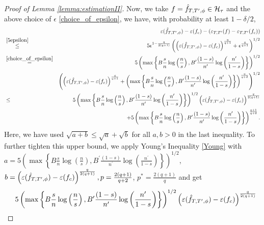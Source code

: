 \documentclass{article}
\begin{document}
\begin{proof}[Proof of Lemma \ref{lemma:estimationII}]
Now, we take $f = \Hat{f}_{T, T^\prime,\phi} \in \mathcal{H}_\tau$ and the above choice of $\epsilon$ \eqref{choice_of_epsilon}, we have,  with probability at least $1-\delta/2$, 
\begin{eqnarray*}
&&  \varepsilon (\Hat{f}_{T, T^\prime,\phi}) - \varepsilon (f_c) - \left(\varepsilon_{T, T'} (f) - \varepsilon_{T, T'} (f_c)\right)\\
  &\stackrel{\eqref{5epsilon}}{\leq}& 5 \epsilon^{1-{\frac{q}{2(q+1)}}}\left(\left(\varepsilon (\Hat{f}_{T, T^\prime,\phi}) - \varepsilon (f_c)\right)^{\frac{q}{q+1}} + \epsilon^{\frac{q}{q+1}}\right)^{1/2}\\
  &\stackrel{\eqref{choice_of_epsilon}}{=}& 5 \left(  \max\left\{ B \frac{s}{n}
\log \left(\frac{n}{s}\right),B^\prime \frac{(1-s)}{n^\prime}\log \left(\frac{n^\prime}{1-s}\right) \right\}\right)^{1/2}\\
&&\left(\left(\varepsilon (\Hat{f}_{T, T^\prime,\phi}) - \varepsilon (f_c)\right)^{\frac{q}{q+1}} + \left( \max\left\{ B  \frac{s}{n}
\log \left(\frac{n}{s}\right), B^\prime \frac{(1-s)}{n^\prime}\log \left(\frac{n^\prime}{1-s}\right) \right\}\right)^{\frac{q}{q+2} } \right)^{1/2} \\
&\leq& 5 \left(  \max\left\{ B \frac{s}{n}
\log \left(\frac{n}{s}\right), B^\prime \frac{(1-s)}{n^\prime}\log \left(\frac{n^\prime}{1-s}\right) \right\} \right)^{1/2} \left(\varepsilon (\Hat{f}_{T, T^\prime,\phi}) - \varepsilon (f_c)\right)^{\frac{q}{2(q+1)}} \\
&& + 5 \left(  \max\left\{ B \frac{s}{n}
\log \left(\frac{n}{s}\right), B^\prime\frac{(1-s)}{n^\prime}\log \left(\frac{n^\prime}{1-s}\right) \right\}\right)^{\frac{q+1}{q+2}}.
\end{eqnarray*}
Here, we have used $\sqrt{a+b} \leq \sqrt{a} + \sqrt{b}$ for all $a,b >0$ in the last inequality.  To further tighten this upper bound, we apply Young's Inequality \eqref{Young} with\\
$a=5 \left(  \max\left\{  B\frac{s}{n}
\log \left(\frac{n}{s}\right),  B^\prime \frac{(1-s)}{n^\prime}\log \left(\frac{n^\prime}{1-s}\right) \right\} \right)^{1/2}$,
$b= \left(\varepsilon (\Hat{f}_{T, T^\prime,\phi}) - \varepsilon (f_c)\right)^{\frac{q}{2(q+1)}}, p=\frac{2(q+1)}{q+2}$, $ p^*=\frac{2(q+1)}{q}$ and get
\begin{eqnarray}\label{apply_Young}
  &&  5 \left(  \max\left\{  B\frac{s}{n}
\log \left(\frac{n}{s}\right),  B^\prime \frac{(1-s)}{n^\prime}\log \left(\frac{n^\prime}{1-s}\right) \right\} \right)^{1/2} \left(\varepsilon (\Hat{f}_{T, T^\prime,\phi}) - \varepsilon (f_c)\right)^{\frac{q}{2(q+1)}} \nonumber\\

\end{eqnarray}
\end{proof}
\end{document}
